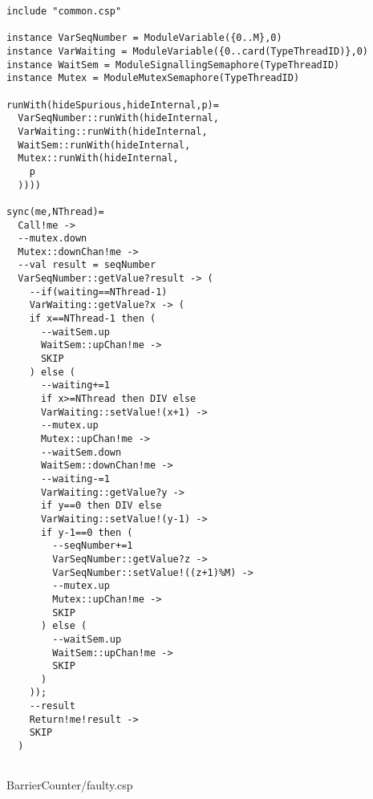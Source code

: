 \begin{lstlisting}
include "common.csp"

instance VarSeqNumber = ModuleVariable({0..M},0)
instance VarWaiting = ModuleVariable({0..card(TypeThreadID)},0)
instance WaitSem = ModuleSignallingSemaphore(TypeThreadID)
instance Mutex = ModuleMutexSemaphore(TypeThreadID)

runWith(hideSpurious,hideInternal,p)=
  VarSeqNumber::runWith(hideInternal,
  VarWaiting::runWith(hideInternal,
  WaitSem::runWith(hideInternal,
  Mutex::runWith(hideInternal,
    p
  ))))

sync(me,NThread)=
  Call!me ->
  --mutex.down
  Mutex::downChan!me ->
  --val result = seqNumber
  VarSeqNumber::getValue?result -> (
    --if(waiting==NThread-1)
    VarWaiting::getValue?x -> (
    if x==NThread-1 then (
      --waitSem.up
      WaitSem::upChan!me ->
      SKIP
    ) else (
      --waiting+=1
      if x>=NThread then DIV else
      VarWaiting::setValue!(x+1) ->
      --mutex.up
      Mutex::upChan!me ->
      --waitSem.down
      WaitSem::downChan!me ->
      --waiting-=1
      VarWaiting::getValue?y ->
      if y==0 then DIV else
      VarWaiting::setValue!(y-1) ->
      if y-1==0 then (
        --seqNumber+=1
        VarSeqNumber::getValue?z ->
        VarSeqNumber::setValue!((z+1)%M) ->
        --mutex.up
        Mutex::upChan!me ->
        SKIP
      ) else (
        --waitSem.up
        WaitSem::upChan!me ->
        SKIP
      )
    ));
    --result
    Return!me!result ->
    SKIP
  )
  

\end{lstlisting}
BarrierCounter/faulty.csp
